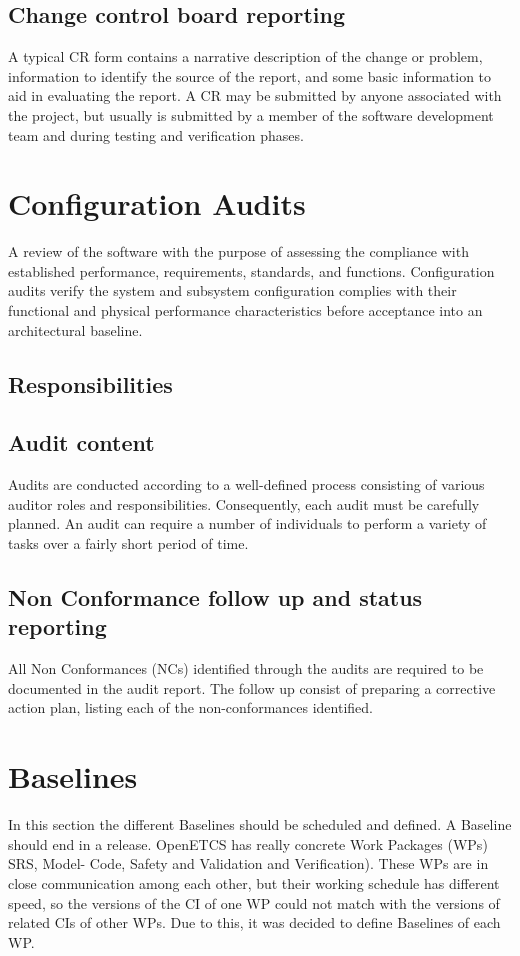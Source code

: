\documentclass{template/openetcs_article}
\begin{document}
\subsection{Change control board reporting}
A typical CR form contains a narrative description of the change or problem, information to identify the source of the report,  and some basic information to aid in evaluating the report. A CR may be submitted by anyone associated with the project, but  usually is submitted by a member of the software development team and during testing and verification phases.


\section{Configuration Audits}
A review of the software with the purpose of assessing the compliance with established performance, requirements,  standards, and functions. Configuration audits verify the system and subsystem configuration complies with their functional  and physical performance characteristics before acceptance into an architectural baseline.

\subsection{Responsibilities}

\subsection{Audit content}
Audits are conducted according to a well-defined process consisting of various auditor roles and responsibilities. Consequently,   each audit must be carefully planned. An audit can require a number of individuals to perform a variety of tasks over a fairly  short period of time.

\subsection{Non Conformance follow up and status reporting}
All Non Conformances (NCs) identified through the audits are required to be documented in the audit report. The follow up  consist of preparing a corrective action plan, listing each of the non-conformances identified.


\section{Baselines}
In this section the different Baselines should be scheduled and defined. A Baseline should end in a release. OpenETCS has  really concrete Work Packages (WPs) SRS, Model- Code, Safety and Validation and Verification). These WPs are in close  communication among each other, but their working schedule has different speed, so the versions of the CI of one WP could  not match with the versions of related CIs of other WPs. Due to this, it was decided to define Baselines of each WP.
\end{document}
